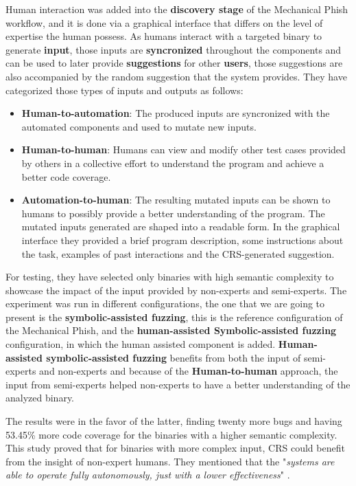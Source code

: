 \documentclass[12pt,a4paper,english,onecolumn]{IEEEtran}
\begin{document}
Human interaction was added into the \textbf{discovery stage} of the Mechanical Phish workflow, and it is done via a graphical interface that differs on the level of expertise the human possess. As humans interact with a targeted binary to generate \textbf{input}, those inputs are \textbf{syncronized} throughout the components and can be used to later provide \textbf{suggestions} for other \textbf{users}, those suggestions are also accompanied by the random suggestion that the system provides. They have categorized those types of inputs and outputs as follows:
\begin{itemize}
    \item \textbf{Human-to-automation}: The produced inputs are syncronized with the automated components and used to mutate new inputs.
    \item \textbf{Human-to-human}: Humans can view and modify other test cases provided by others in a collective effort to understand the program and achieve a better code coverage.
    \item \textbf{Automation-to-human}: The resulting mutated inputs can be shown to humans to possibly provide a better understanding of the program. The mutated inputs generated are shaped into a readable form. In the graphical interface they provided a brief program description, some instructions about the task, examples of past interactions and the CRS-generated suggestion.
\end{itemize}

For testing, they have selected only binaries with high semantic complexity to showcase the impact of the input provided by non-experts and semi-experts. The experiment was run in different configurations, the one that we are going to present is the \textbf{symbolic-assisted fuzzing}, this is the reference configuration of the Mechanical Phish, and the \textbf{human-assisted Symbolic-assisted fuzzing} configuration, in which the human assisted component is added. \textbf{Human-assisted symbolic-assisted fuzzing} benefits from both the input of semi-experts and non-experts and because of the \textbf{Human-to-human} approach, the input from semi-experts helped non-experts to have a better understanding of the analyzed binary.

The results were in the favor of the latter, finding twenty more bugs and having 53.45\% more code coverage for the binaries with a higher semantic complexity. This study proved that for binaries with more complex input, CRS could benefit from the insight of non-expert humans. They mentioned that the "\textit{systems are able to operate fully autonomously, just with a lower effectiveness}" \cite{hacrs}.
\end{document}
